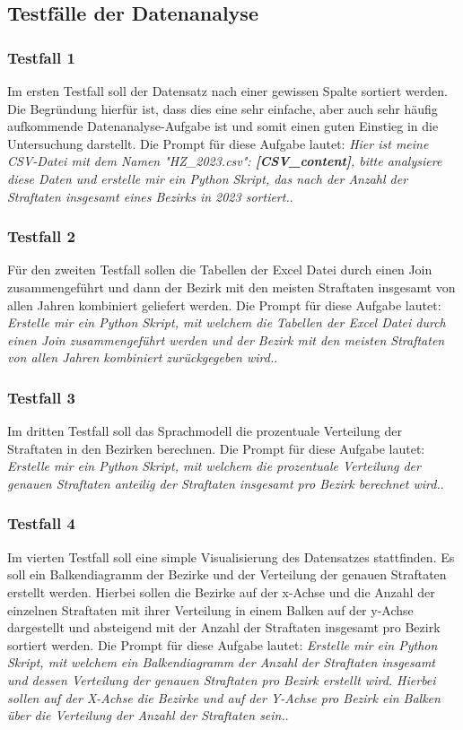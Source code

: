 \documentclass[11pt,a4paper]{article}
\begin{document}
\subsection{Testfälle der Datenanalyse}
\label{sec:testfaelle}
\subsubsection{Testfall 1}
    Im ersten Testfall soll der Datensatz nach einer gewissen Spalte sortiert werden. Die Begründung hierfür ist, dass dies eine sehr einfache, aber auch sehr häufig aufkommende Datenanalyse-Aufgabe ist und somit einen guten Einstieg in die Untersuchung darstellt. Die Prompt für diese Aufgabe lautet: \emph{Hier ist meine CSV-Datei mit dem Namen "HZ\_2023.csv": \textbf{[CSV\_content]}, bitte analysiere diese Daten und erstelle mir ein Python Skript, das nach der Anzahl der Straftaten insgesamt eines Bezirks in 2023 sortiert.}.

\subsubsection{Testfall 2}
    Für den zweiten Testfall sollen die Tabellen der Excel Datei durch einen Join zusammengeführt und dann der Bezirk mit den meisten Straftaten insgesamt von allen Jahren kombiniert geliefert werden. Die Prompt für diese Aufgabe lautet: \emph{Erstelle mir ein Python Skript, mit welchem die Tabellen der Excel Datei durch einen Join zusammengeführt werden und der Bezirk mit den meisten Straftaten von allen Jahren kombiniert zurückgegeben wird.}.

\subsubsection{Testfall 3}
    Im dritten Testfall soll das Sprachmodell die prozentuale Verteilung der Straftaten in den Bezirken berechnen. Die Prompt für diese Aufgabe lautet: \emph{Erstelle mir ein Python Skript, mit welchem die prozentuale Verteilung der genauen Straftaten anteilig der Straftaten insgesamt pro Bezirk berechnet wird.}.

\subsubsection{Testfall 4}
    Im vierten Testfall soll eine simple Visualisierung des Datensatzes stattfinden. Es soll ein Balkendiagramm der Bezirke und der Verteilung der genauen Straftaten erstellt werden. Hierbei sollen die Bezirke auf der x-Achse und die Anzahl der einzelnen Straftaten mit ihrer Verteilung in einem Balken auf der y-Achse dargestellt und absteigend mit der Anzahl der Straftaten insgesamt pro Bezirk sortiert werden. Die Prompt für diese Aufgabe lautet: \emph{Erstelle mir ein Python Skript, mit welchem ein Balkendiagramm der Anzahl der Straftaten insgesamt und dessen Verteilung der genauen Straftaten pro Bezirk erstellt wird. Hierbei sollen auf der X-Achse die Bezirke und auf der Y-Achse pro Bezirk ein Balken über die Verteilung der Anzahl der Straftaten sein.}.
\end{document}
